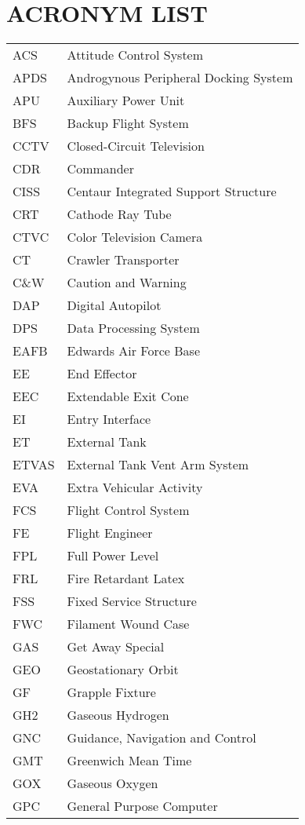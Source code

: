 \documentclass[Space_Shuttle_Vessel_Manual.tex]{subfiles}
\begin{document}
\section{ACRONYM LIST}
\label{sec:acronym-list}
\noindent
\begin{longtable}{l l }
ACS & Attitude Control System\\
APDS & Androgynous Peripheral Docking System\\
APU & Auxiliary Power Unit\\
BFS & Backup Flight System\\
CCTV & Closed-Circuit Television\\
CDR & Commander\\
CISS & Centaur Integrated Support Structure\\
CRT & Cathode Ray Tube\\
CTVC & Color Television Camera\\
CT & Crawler Transporter\\
C\&W & Caution and Warning\\
DAP & Digital Autopilot\\
DPS & Data Processing System\\
EAFB & Edwards Air Force Base\\
EE & End Effector\\
EEC & Extendable Exit Cone\\
EI & Entry Interface\\
ET & External Tank\\
ETVAS & External Tank Vent Arm System\\
EVA & Extra Vehicular Activity\\
FCS & Flight Control System\\
FE & Flight Engineer\\
FPL & Full Power Level\\
FRL & Fire Retardant Latex\\
FSS & Fixed Service Structure\\
FWC & Filament Wound Case\\
GAS & Get Away Special\\
GEO & Geostationary Orbit\\
GF & Grapple Fixture\\
GH2 & Gaseous Hydrogen\\
GNC & Guidance, Navigation and Control\\
GMT & Greenwich Mean Time\\
GOX & Gaseous Oxygen\\
GPC & General Purpose Computer\\

\end{longtable}
\end{document}
